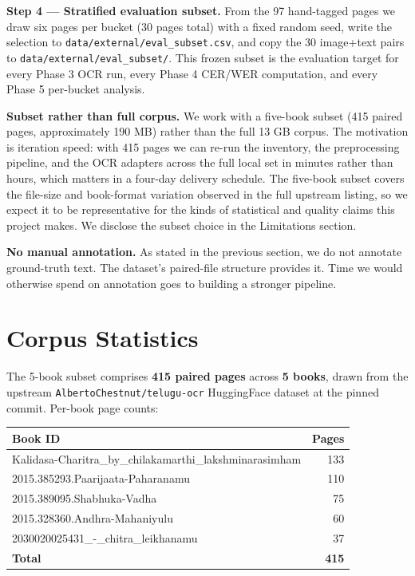 \documentclass[
  letterpaper,
  DIV=11,
  numbers=noendperiod]{scrartcl}
\newcounter{none} %
\begin{document}
\textbf{Step 4 --- Stratified evaluation subset.} From the 97
hand-tagged pages we draw six pages per bucket (30 pages total) with a
fixed random seed, write the selection to
\texttt{data/external/eval\_subset.csv}, and copy the 30 image+text
pairs to \texttt{data/external/eval\_subset/}. This frozen subset is the
evaluation target for every Phase 3 OCR run, every Phase 4 CER/WER
computation, and every Phase 5 per-bucket analysis.

\textbf{Subset rather than full corpus.} We work with a five-book subset
(415 paired pages, approximately 190 MB) rather than the full 13 GB
corpus. The motivation is iteration speed: with 415 pages we can re-run
the inventory, the preprocessing pipeline, and the OCR adapters across
the full local set in minutes rather than hours, which matters in a
four-day delivery schedule. The five-book subset covers the file-size
and book-format variation observed in the full upstream listing, so we
expect it to be representative for the kinds of statistical and quality
claims this project makes. We disclose the subset choice in the
Limitations section.

\textbf{No manual annotation.} As stated in the previous section, we do
not annotate ground-truth text. The dataset's paired-file structure
provides it. Time we would otherwise spend on annotation goes to
building a stronger pipeline.

\section{Corpus Statistics}\label{corpus-statistics}

The 5-book subset comprises \textbf{415 paired pages} across \textbf{5
books}, drawn from the upstream \texttt{AlbertoChestnut/telugu-ocr}
HuggingFace dataset at the pinned commit. Per-book page counts:

{\def\LTcaptype{none} %
\begin{longtable}[]{@{}lr@{}}
\toprule\noalign{}
Book ID & Pages \\
\midrule\noalign{}
\endhead
\bottomrule\noalign{}
\endlastfoot
Kalidasa-Charitra\_by\_chilakamarthi\_lakshminarasimham & 133 \\
2015.385293.Paarijaata-Paharanamu & 110 \\
2015.389095.Shabhuka-Vadha & 75 \\
2015.328360.Andhra-Mahaniyulu & 60 \\
2030020025431\_-\_chitra\_leikhanamu & 37 \\
\textbf{Total} & \textbf{415} \\
\end{longtable}
}
\end{document}
